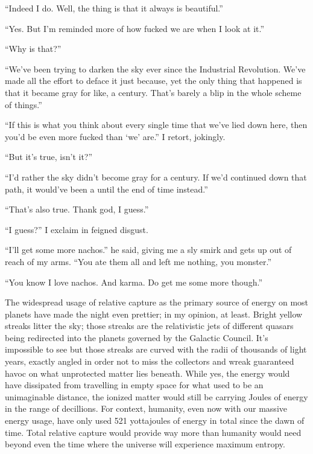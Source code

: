 \documentclass{book}
\begin{document}
			``Indeed I do. Well, the thing is that it always is beautiful.''

			``Yes. But I'm reminded more of how fucked we are when I look at it.''

			``Why is that?''

			``We've been trying to darken the sky ever since the Industrial Revolution. We've
			made all the effort to deface it just because, yet the only thing that happened is
			that it became gray for like, a century. That's barely a blip in the whole scheme of
			things.''

			``If this is what you think about every single time that we've lied down here, then
			you'd be even more fucked than `we' are.'' I retort, jokingly.

			``But it's true, isn't it?''

			``I'd rather the sky didn't become gray for a century. If we'd continued down that
			path, it would've been a until the end of time instead.''

			``That's also true. Thank god, I guess.''

			``I guess?'' I exclaim in feigned disgust.

			``I'll get some more nachos.'' he said, giving me a sly smirk and gets up out of reach
			of my arms. ``You ate them all and left me nothing, you monster.''

			``You know I love nachos. And karma. Do get me some more though.''

			The widespread usage of relative capture as the primary source of energy on most
			planets have made the night even prettier; in my opinion, at least. Bright yellow
			streaks litter the sky; those streaks are the relativistic jets of different quasars
			being redirected into the planets governed by the Galactic Council. It's impossible to
			see but those streaks are curved with the radii of thousands of light years, exactly
			angled in order not to miss the collectors and wreak guaranteed havoc on what
			unprotected matter lies beneath. While yes, the energy would have dissipated from
			travelling in empty space for what used to be an unimaginable distance, the ionized
			matter would still be carrying Joules of energy in the range of decillions. For
			context, humanity, even now with our massive energy usage, have only used 521
			yottajoules of energy in total since the dawn of time. Total relative capture would
			provide way more than humanity would need beyond even the time where the universe will
			experience maximum entropy.
\end{document}
